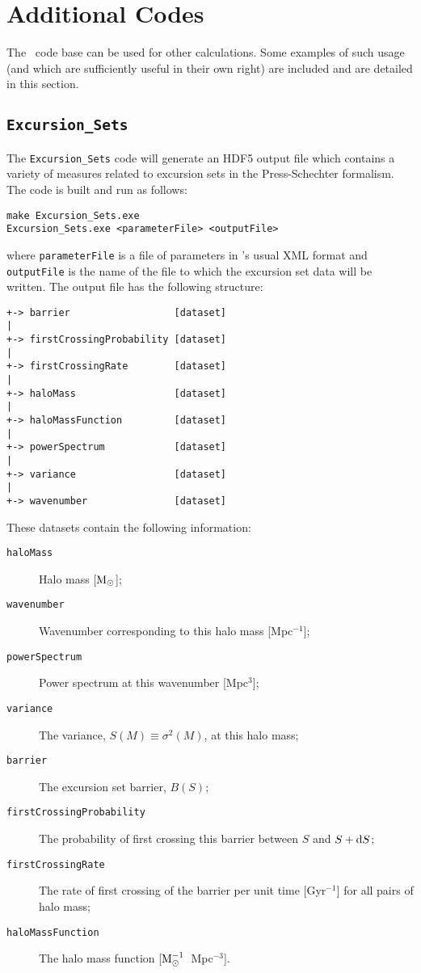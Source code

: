 \section{Additional Codes}

The \glc\ code base can be used for other calculations. Some examples of such usage (and which are sufficiently useful in their own right) are included and are detailed in this section.

\subsection{{\tt Excursion\_Sets}}

The {\tt Excursion\_Sets} code will generate an HDF5 output file which contains a variety of measures related to excursion sets in the Press-Schechter formalism. The code is built and run as follows:
\begin{verbatim}
make Excursion_Sets.exe
Excursion_Sets.exe <parameterFile> <outputFile>
\end{verbatim}
where {\tt parameterFile} is a file of parameters in \glc's usual XML format and {\tt outputFile} is the name of the file to which the excursion set data will be written. The output file has the following structure:
\begin{verbatim}
+-> barrier                  [dataset]
|
+-> firstCrossingProbability [dataset]
|
+-> firstCrossingRate        [dataset]
|
+-> haloMass                 [dataset]
|
+-> haloMassFunction         [dataset]
|
+-> powerSpectrum            [dataset]
|
+-> variance                 [dataset]
|
+-> wavenumber               [dataset]
\end{verbatim}
These datasets contain the following information:
\begin{description}
 \item [{\tt haloMass}] Halo mass [${\rm M}_\odot$];
 \item [{\tt wavenumber}] Wavenumber corresponding to this halo mass [Mpc$^{-1}$];
 \item [{\tt powerSpectrum}] Power spectrum at this wavenumber [Mpc$^3$];
 \item [{\tt variance}] The variance, $S(M)\equiv\sigma^2(M)$, at this halo mass;
 \item [{\tt barrier}] The excursion set barrier, $B(S)$;
 \item [{\tt firstCrossingProbability}] The probability of first crossing this barrier between $S$ and $S+{\rm d}S$;
 \item [{\tt firstCrossingRate}] The rate of first crossing of the barrier per unit time [Gyr$^{-1}$] for all pairs of halo mass;
 \item [{\tt haloMassFunction}] The halo mass function [${\rm M}^{-1}_\odot$~Mpc$^{-3}$].
\end{description}

